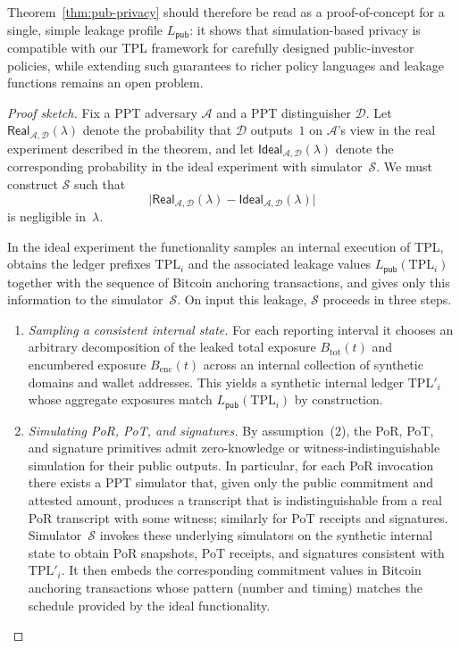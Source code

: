 \documentclass[11pt]{article}
\begin{document}
Theorem~\ref{thm:pub-privacy} should therefore be read as a proof-of-concept for a single, simple leakage profile $L_{\mathsf{pub}}$: it shows that simulation-based privacy is compatible with our TPL framework for carefully designed public-investor policies, while extending such guarantees to richer policy languages and leakage functions remains an open problem.

\begin{proof}[Proof sketch]
Fix a PPT adversary $\mathcal{A}$ and a PPT distinguisher
$\mathcal{D}$.
Let $\mathsf{Real}_{\mathcal{A},\mathcal{D}}(\lambda)$ denote the
probability that $\mathcal{D}$ outputs~$1$ on $\mathcal{A}$'s view in the
real experiment described in the theorem, and let
$\mathsf{Ideal}_{\mathcal{A},\mathcal{D}}(\lambda)$ denote the corresponding
probability in the ideal experiment with simulator~$\mathcal{S}$.
We must construct $\mathcal{S}$ such that
\[
  \bigl|
    \mathsf{Real}_{\mathcal{A},\mathcal{D}}(\lambda)
    - \mathsf{Ideal}_{\mathcal{A},\mathcal{D}}(\lambda)
  \bigr|
\]
is negligible in~$\lambda$.

In the ideal experiment the functionality samples an internal execution of
TPL, obtains the ledger prefixes $\mathrm{TPL}_i$ and the associated leakage
values $L_{\mathsf{pub}}(\mathrm{TPL}_i)$ together with the sequence of
Bitcoin anchoring transactions, and gives only this information to the
simulator~$\mathcal{S}$.
On input this leakage, $\mathcal{S}$ proceeds in three steps.

\begin{enumerate}[noitemsep]
  \item \emph{Sampling a consistent internal state.}
        For each reporting interval it chooses an arbitrary decomposition of
        the leaked total exposure $B_{\mathrm{tot}}(t)$ and encumbered exposure
        $B_{\mathrm{enc}}(t)$ across an internal collection of synthetic
        domains and wallet addresses.
        This yields a synthetic internal ledger $\mathrm{TPL}'_i$ whose
        aggregate exposures match $L_{\mathsf{pub}}(\mathrm{TPL}_i)$ by
        construction.

  \item \emph{Simulating PoR, PoT, and signatures.}
        By assumption~(2), the PoR, PoT, and signature primitives admit
        zero-knowledge or witness-indistinguishable simulation for their
        public outputs.
        In particular, for each PoR invocation there exists a PPT simulator
        that, given only the public commitment and attested amount, produces a
        transcript that is indistinguishable from a real PoR transcript with
        some witness; similarly for PoT receipts and signatures.
        Simulator~$\mathcal{S}$ invokes these underlying simulators on the
        synthetic internal state to obtain PoR snapshots, PoT receipts, and
        signatures consistent with $\mathrm{TPL}'_i$.
        It then embeds the corresponding commitment values in Bitcoin
        anchoring transactions whose pattern (number and timing) matches the
        schedule provided by the ideal functionality.


\end{enumerate}
\end{proof}
\end{document}
